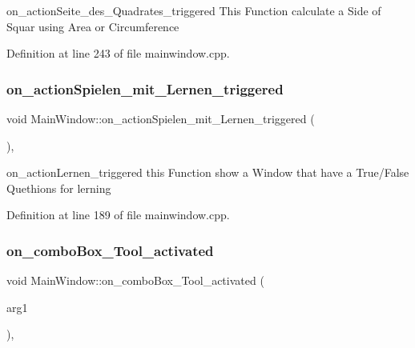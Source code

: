 on\+\_\+action\+Seite\+\_\+des\+\_\+\+Quadrates\+\_\+triggered This Function calculate a Side of Squar using Area or Circumference 



Definition at line 243 of file mainwindow.\+cpp.

\mbox{\label{class_main_window_aa268869cf5d64f54ee51f41c19a0ee4a}} 
\subsubsection{\texorpdfstring{on\+\_\+action\+Spielen\+\_\+mit\+\_\+\+Lernen\+\_\+triggered}{on\_actionSpielen\_mit\_Lernen\_triggered}}
{\footnotesize\ttfamily void Main\+Window\+::on\+\_\+action\+Spielen\+\_\+mit\+\_\+\+Lernen\+\_\+triggered (\begin{DoxyParamCaption}{ }\end{DoxyParamCaption})\hspace{0.3cm}{\ttfamily [private]}, {\ttfamily [slot]}}



on\+\_\+action\+Lernen\+\_\+triggered this Function show a Window that have a True/\+False Quethions for lerning 



Definition at line 189 of file mainwindow.\+cpp.

\mbox{\label{class_main_window_a1b5f937fcb725434e148ef777c706ae5}} 
\subsubsection{\texorpdfstring{on\+\_\+combo\+Box\+\_\+\+Tool\+\_\+activated}{on\_comboBox\_Tool\_activated}}
{\footnotesize\ttfamily void Main\+Window\+::on\+\_\+combo\+Box\+\_\+\+Tool\+\_\+activated (\begin{DoxyParamCaption}\item[{const Q\+String \&}]{arg1 }\end{DoxyParamCaption})\hspace{0.3cm}{\ttfamily [private]}, {\ttfamily [slot]}}




